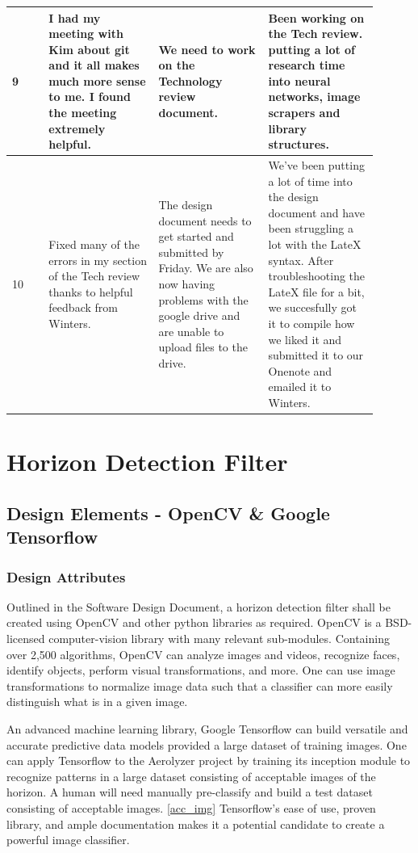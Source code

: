 \documentclass[onecolumn, draftclsnofoot,10pt, compsoc]{IEEEtran}
\begin{document}
\begin{singlespace}
\begin{longtable}{|l|p{0.3\linewidth}|p{0.3\linewidth}|p{0.3\linewidth}|}
		9 	& I had my meeting with Kim about git and it all makes much more sense to me. I found the meeting extremely helpful. & We need to work on the Technology review document. & Been working on the Tech review. putting a lot of research time into neural networks, image scrapers and library structures. \\\hline

		10 	& Fixed many of the errors in my section of the Tech review thanks to helpful feedback from Winters. & The design document needs to get started and submitted by Friday. We are also now having problems with the google drive and are unable to upload files to the drive. & We've been putting a lot of time into the design document and have been struggling a lot with the LateX syntax. After troubleshooting the LateX file for a bit, we succesfully got it to compile how we liked it and submitted it to our Onenote and emailed it to Winters. \\\hline
		\end{longtable}


		

	\section{Horizon Detection Filter}
      \subsection{Design Elements - OpenCV \& Google Tensorflow}
      		\subsubsection{Design Attributes}
		        Outlined in the Software Design Document, a horizon detection filter shall be created using OpenCV and other python libraries as required.
				OpenCV is a BSD-licensed computer-vision library with many relevant sub-modules.
				Containing over 2,500 algorithms, OpenCV can analyze images and videos, recognize faces, identify objects, perform visual transformations, and more.
				One can use image transformations to normalize image data such that a classifier can more easily distinguish what is in a given image.
				\cite{svm}

				An advanced machine learning library, Google Tensorflow can build versatile and accurate predictive data models provided a large dataset of training images.
				One can apply Tensorflow to the Aerolyzer project by training its inception module to recognize patterns in a large dataset consisting of acceptable images of the horizon.
				A human will need manually pre-classify and build a test dataset consisting of acceptable images. \ref{acc_img}
				Tensorflow’s ease of use, proven library, and ample documentation makes it a potential candidate to create a powerful image classifier. \cite{rhnvrm} \cite{RNN}


\end{singlespace}
\end{document}
